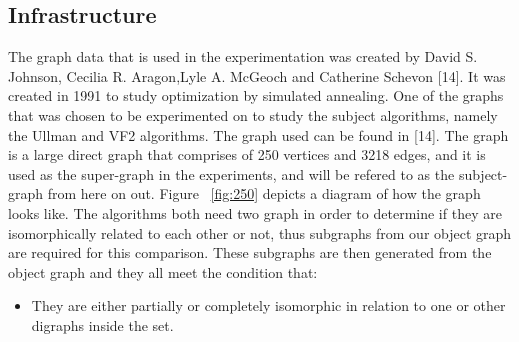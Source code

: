 \subsection{Infrastructure}
\label{Data Set}

The graph data that is used in the experimentation was created by David S. Johnson, Cecilia R. Aragon,Lyle A. McGeoch and Catherine Schevon [14]. 
It was created in 1991 to study optimization by simulated annealing. One of the graphs that was chosen to be experimented on to study the subject
algorithms, namely the Ullman and VF2 algorithms. The graph used can be found in [14].\newline\newline
The graph is a large direct graph that comprises of 250 vertices and 3218 edges, and it is used as the super-graph in the experiments, 
and will be refered to as the subject-graph from here on out. Figure ~\ref{fig:250} depicts a diagram of how the graph looks like.\newline\newline
The algorithms both need two graph in order to determine if they are isomorphically related to each other or not, thus subgraphs from our object graph
are required for this comparison. These subgraphs are then generated from the object graph and they all meet the condition that:
\begin{itemize}
  \item They are either partially or completely isomorphic in relation to one or other digraphs inside the set.
\end{itemize}


